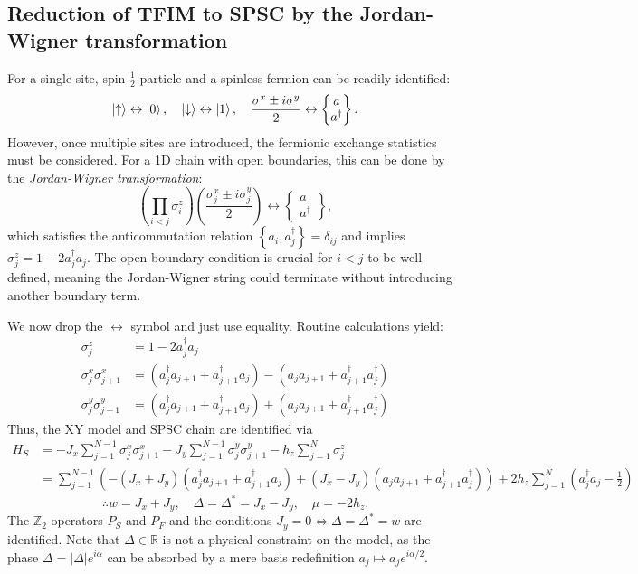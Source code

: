 \documentclass{article}
\begin{document}
\subsection{Reduction of TFIM to SPSC by the Jordan-Wigner transformation}
For a single site, spin-$\frac{1}{2}$ particle and a spinless fermion can be readily identified:
\[
    \ket{\uparrow} \leftrightarrow \ket{0},\quad
    \ket{\downarrow} \leftrightarrow \ket{1},\quad
    \frac{\sigma^x \pm i \sigma^y}{2} \leftrightarrow \begin{Bmatrix} a \\ a^\dagger \end{Bmatrix}.
\]
However, once multiple sites are introduced, the fermionic exchange statistics must be considered.
For a 1D chain with open boundaries, this can be done by the \emph{Jordan-Wigner transformation}:
\[
    \left( \prod_{i<j} \sigma_i^z \right) \left( \frac{\sigma_j^x \pm i\sigma_j^y}{2} \right)
    \leftrightarrow \begin{Bmatrix} a \\ a^\dagger \end{Bmatrix},
\]
which satisfies the anticommutation relation $\left\{a_i, a_j^\dagger\right\} = \delta_{ij}$
and implies $\sigma_j^z = 1 - 2a_j^\dagger a_j$.
The open boundary condition is crucial for $i<j$ to be well-defined,
meaning the Jordan-Wigner string could terminate without introducing
another boundary term.

We now drop the $\leftrightarrow$ symbol and just use equality.
Routine calculations yield:
\begin{align*}
    \sigma_j^z &= 1 - 2a_j^\dagger a_j \\
    \sigma_j^x \sigma_{j+1}^x &= \left(a_j^\dagger a_{j+1} + a_{j+1}^\dagger a_j\right)
                               - \left(a_j a_{j+1} + a_{j+1}^\dagger a_j^\dagger\right) \\
    \sigma_j^y \sigma_{j+1}^y &= \left(a_j^\dagger a_{j+1} + a_{j+1}^\dagger a_j\right)
                               + \left(a_j a_{j+1} + a_{j+1}^\dagger a_j^\dagger\right)
\end{align*}
Thus, the XY model and SPSC chain are identified via
\begin{align*}
    H_S
    &= -J_x\sum_{j=1}^{N-1} \sigma_j^x \sigma_{j+1}^x
       -J_y\sum_{j=1}^{N-1} \sigma_j^y \sigma_{j+1}^y
       -h_z \sum_{j=1}^N \sigma_j^z \\
    &= \sum_{j=1}^{N-1} \left(
        -\left( J_x + J_y \right) \left( a_j^\dagger a_{j+1} + a_{j+1}^\dagger a_j \right)
        +\left( J_x - J_y \right) \left( a_ja_{j+1} + a_{j+1}^\dagger a_j^\dagger \right)
    \right) + 2h_z \sum_{j=1}^N \left( a_j^\dagger a_j - \frac{1}{2} \right)
\end{align*}
\[
    \therefore w = J_x + J_y,\quad
    \Delta = \Delta^* = J_x - J_y,\quad
    \mu = -2h_z.
\]
The $\mathbb{Z}_2$ operators $P_S$ and $P_F$
and the conditions $J_y = 0 \iff \Delta = \Delta^* = w$ are identified.
Note that $\Delta \in \mathbb{R}$ is not a physical constraint on the model,
as the phase $\Delta = |\Delta| e^{i\alpha}$ can be absorbed by a mere basis redefinition
$a_j \mapsto a_j e^{i\alpha/2}$.
\end{document}

